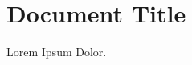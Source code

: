 \documentclass[11pt]{report}
\begin{document}
\label{}
        \section{Document Title}
    Lorem Ipsum Dolor.
\end{document}
